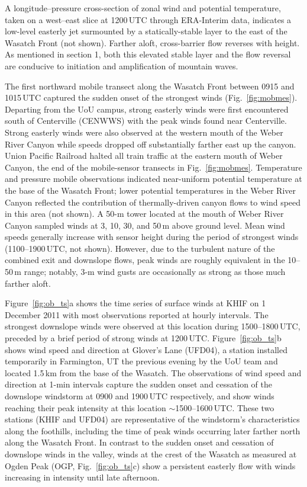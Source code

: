 \documentclass[pdftex,12pt]{article}
\def\around{$\sim$}
\begin{document}
A longitude--pressure cross-section of zonal wind and potential temperature, taken on a west--east slice at 1200\,UTC through ERA-Interim data, indicates a low-level easterly jet surmounted by a statically-stable layer to the east of the Wasatch Front (not shown). Farther aloft, cross-barrier flow reverses with height. As mentioned in section 1, both this elevated stable layer and the flow reversal are conducive to initiation and amplification of mountain waves.

The first northward mobile transect along the Wasatch Front between 0915 and 1015\,UTC captured the sudden onset of the strongest winds (Fig.~\ref{fig:mobmes}). Departing from the UoU campus, strong easterly winds were first encountered south of Centerville (CENWWS) with the peak winds found near Centerville. Strong easterly winds were also observed at the western mouth of the Weber River Canyon while speeds dropped off substantially farther east up the canyon. Union Pacific Railroad halted all train traffic at the eastern mouth of Weber Canyon, the end of the mobile-sensor transects in Fig.~\ref{fig:mobmes}. Temperature and pressure mobile observations indicated near-uniform potential temperature at the base of the Wasatch Front; lower potential temperatures in the Weber River Canyon reflected the contribution of thermally-driven canyon flows to wind speed in this area (not shown). A 50-m tower located at the mouth of Weber River Canyon \citep{Chrust2013} sampled winds at 3, 10, 30, and 50\,m above ground level. Mean wind speeds generally increase with sensor height during the period of strongest winds (1100--1900\,UTC, not shown). However, due to the turbulent nature of the combined exit and downslope flows, peak winds are roughly equivalent in the 10--50\,m range; notably, 3-m wind gusts are occasionally as strong as those much farther aloft.

Figure~\ref{fig:ob_ts}a shows the time series of surface winds at KHIF on 1 December 2011 with most observations reported at hourly intervals. The strongest downslope winds were observed at this location during 1500--1800\,UTC, preceded by a brief period of strong winds at 1200\,UTC. Figure~\ref{fig:ob_ts}b shows wind speed and direction at Glover's Lane (UFD04), a station installed temporarily in Farmington, UT the previous evening by the UoU team and located 1.5\,km from the base of the Wasatch. The observations of wind speed and direction at 1-min intervals capture the sudden onset and cessation of the downslope windstorm at 0900 and 1900\,UTC respectively, and show winds reaching their peak intensity at this location \around 1500--1600\,UTC. These two stations (KHIF and UFD04) are representative of the windstorm's characteristics along the foothills, including the time of peak winds occurring later farther north along the Wasatch Front. In contrast to the sudden onset and cessation of downslope winds in the valley, winds at the crest of the Wasatch as measured at Ogden Peak (OGP, Fig.~\ref{fig:ob_ts}c) show a persistent easterly flow with winds increasing in intensity until late afternoon.
\end{document}
